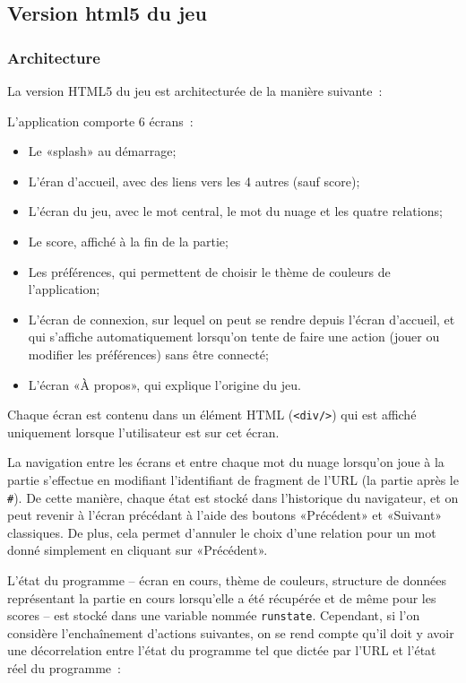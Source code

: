 \documentclass[a4paper,11pt,french]{article}
\begin{document}
\subsection{Version html5 du jeu}
\label{sec:html5}
\subsubsection{Architecture}

La version HTML5 du jeu est architecturée de la manière suivante~:

L'application comporte 6 écrans~:
\begin{itemize}
\item Le «splash» au démarrage;
\item L'éran d'accueil, avec des liens vers les 4 autres (sauf score);
\item L'écran du jeu, avec le mot central, le mot du nuage et les quatre relations;
\item Le score, affiché à la fin de la partie;
\item Les préférences, qui permettent de choisir le thème de couleurs de l'application;
\item L'écran de connexion, sur lequel on peut se rendre depuis l'écran d'accueil, et qui s'affiche automatiquement lorsqu'on tente de faire
  une action (jouer ou modifier les préférences) sans être connecté;
\item L'écran «À propos», qui explique l'origine du jeu.
\end{itemize}
Chaque écran est contenu dans un élément HTML (\verb!<div/>!) qui est affiché uniquement lorsque l'utilisateur est sur cet écran.

La navigation entre les écrans et entre chaque mot du nuage lorsqu'on joue à la partie s'effectue en modifiant l'identifiant de fragment
de l'URL (la partie après le \verb!#!). De cette manière, chaque état est stocké dans l'historique du navigateur, et on peut revenir à
l'écran précédant à l'aide des boutons «Précédent» et «Suivant» classiques. De plus, cela permet d'annuler le choix d'une relation pour
un mot donné simplement en cliquant sur «Précédent».

L'état du programme -- écran en cours, thème de couleurs, structure de données représentant la partie en cours lorsqu'elle a été récupérée et de même pour les scores -- est stocké dans une variable nommée \verb!runstate!. Cependant, si l'on considère l'enchaînement d'actions
suivantes, on se rend compte qu'il doit y avoir une décorrelation entre l'état du programme tel que dictée par l'URL et l'état réel du
programme~:
\end{document}
